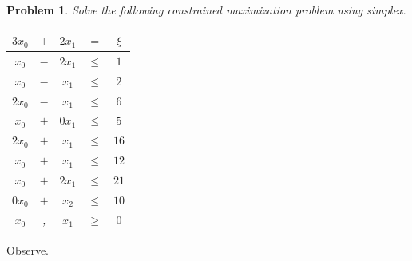 \documentclass[12pt,oneside]{amsart}
\numberwithin{equation}{section}
\numberwithin{figure}{section}
\theoremstyle{plain}
\newtheorem{prob}{Problem}
\theoremstyle{definition}
\begin{document}
\begin{prob}
Solve the following constrained maximization problem using simplex. \\
\begin{center}\begin{tabular}{|ccccc|}
  \hline
  $3x_0$ & $+$ & $2x_1$ & $=$    & $\xi$ \\
  \hline
  $x_0$  & $-$ & $2x_1$ & $\leq$ & $1$   \\
  $x_0$  & $-$ & $x_1$  & $\leq$ & $2$   \\
  $2x_0$ & $-$ & $x_1$  & $\leq$ & $6$   \\
  $x_0$  & $+$ & $0x_1$ & $\leq$ & $5$   \\
  $2x_0$ & $+$ & $x_1$  & $\leq$ & $16$  \\
  $x_0$  & $+$ & $x_1$  & $\leq$ & $12$  \\
  $x_0$  & $+$ & $2x_1$ & $\leq$ & $21$  \\
  $0x_0$ & $+$ & $x_2$  & $\leq$ & $10$  \\
  $x_0$  & ,   & $x_1$  & $\geq$ & $0$   \\
  \hline
\end{tabular}\end{center}
\end{prob}
Observe. \\
\end{document}
